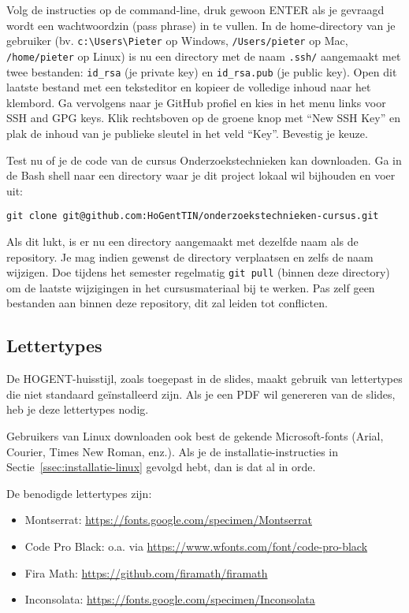 Volg de instructies op de command-line, druk gewoon ENTER als je gevraagd wordt een wachtwoordzin (pass phrase) in te vullen. In de home-directory van je gebruiker (bv. \verb|c:\Users\Pieter| op Windows, \verb|/Users/pieter| op Mac, \verb|/home/pieter| op Linux) is nu een directory met de naam \verb|.ssh/| aangemaakt met twee bestanden: \verb|id_rsa| (je private key) en \verb|id_rsa.pub| (je public key). Open dit laatste bestand met een teksteditor en kopieer de volledige inhoud naar het klembord. Ga vervolgens naar je GitHub profiel en kies in het menu links voor SSH and GPG keys. Klik rechtsboven op de groene knop met ``New SSH Key'' en plak de inhoud van je publieke sleutel in het veld ``Key''. Bevestig je keuze.

Test nu of je de code van de cursus Onderzoekstechnieken kan downloaden. Ga in de Bash shell naar een directory waar je dit project lokaal wil bijhouden en voer uit:

\begin{verbatim}
git clone git@github.com:HoGentTIN/onderzoekstechnieken-cursus.git
\end{verbatim}

Als dit lukt, is er nu een directory aangemaakt met dezelfde naam als de repository. Je mag indien gewenst de directory verplaatsen en zelfs de naam wijzigen. Doe tijdens het semester regelmatig \texttt{git pull} (binnen deze directory) om de laatste wijzigingen in het cursusmateriaal bij te werken. Pas zelf geen bestanden aan binnen deze repository, dit zal leiden tot conflicten.

\subsection{Lettertypes}

De HOGENT-huisstijl, zoals toegepast in de slides, maakt gebruik van lettertypes die niet standaard geïnstalleerd zijn. Als je een PDF wil genereren van de slides, heb je deze lettertypes nodig.

Gebruikers van Linux downloaden ook best de gekende Microsoft-fonts (Arial, Courier, Times New Roman, enz.). Als je de installatie-instructies in Sectie~\ref{ssec:installatie-linux} gevolgd hebt, dan is dat al in orde.

De benodigde lettertypes zijn:

\begin{itemize}
  \item Montserrat: \url{https://fonts.google.com/specimen/Montserrat}
  \item Code Pro Black: o.a. via \url{https://www.wfonts.com/font/code-pro-black}
  \item Fira Math: \url{https://github.com/firamath/firamath}
  \item Inconsolata: \url{https://fonts.google.com/specimen/Inconsolata}
\end{itemize}

